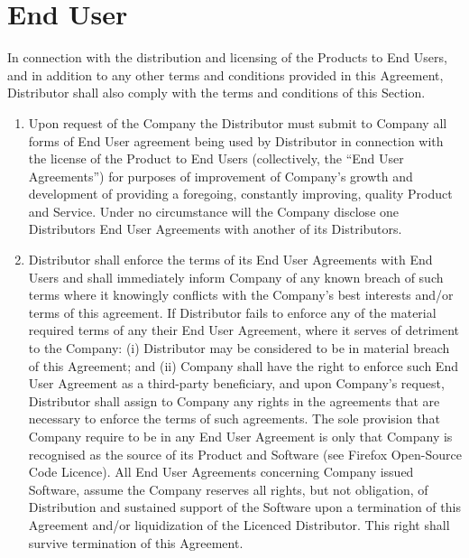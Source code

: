 \documentclass[letterpaper,10pt,english]{sphinxmanual}
\begin{document}
\section{End User}
\label{\detokenize{distributionandpackaging:end-user}}
In connection with the distribution and licensing of the Products to End Users, and in addition to any other terms and conditions provided in this Agreement, Distributor shall also comply with the terms and conditions of this Section.
\begin{enumerate}
\item {} 
Upon request of the Company the Distributor must submit to Company all forms of End User agreement being used by Distributor in connection with the license of the Product to End Users (collectively, the “End User Agreements”) for purposes of improvement of Company’s growth and development of providing a foregoing, constantly improving, quality Product and Service. Under no circumstance will the Company  disclose one Distributors End User Agreements with another of its Distributors.

\item {} 
Distributor shall enforce the terms of its End User Agreements with End Users and shall immediately inform Company of any known breach of such terms where it knowingly conflicts with the Company’s best interests and/or terms of this agreement. If Distributor fails to enforce any of the material required terms of any their End User Agreement, where it serves of detriment to the Company: (i) Distributor may be considered to be in material breach of this Agreement; and (ii) Company shall have the right to enforce such End User Agreement as a third-party beneficiary, and upon Company’s request, Distributor shall assign to Company any rights in the agreements that are necessary to enforce the terms of such agreements. The sole provision that Company require to be in any End User Agreement is only that Company is recognised as the source of its Product and Software (see Firefox Open-Source Code Licence). All End User Agreements concerning Company issued Software, assume the Company reserves all rights, but not obligation, of Distribution and sustained support of the Software upon a termination of this Agreement and/or liquidization of the Licenced Distributor. This right shall survive termination of this Agreement.

\end{enumerate}
\end{document}
